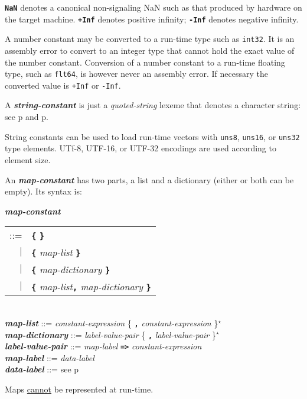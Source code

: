 \documentclass[12pt]{article}
\newcommand{\TT}[1]{{\tt \bfseries #1}}
\newcommand{\STAR}{{\Large $^\star$}}
\newcommand{\emkey}[1]{{\em \bfseries #1}}
\newcommand{\pagref}[1]{p\pageref{#1}}
\newenvironment{indpar}[1][0.3in]%
	{\begin{list}{}%
		     {\setlength{\itemsep}{0in}%
		      \setlength{\topsep}{0in}%
		      \setlength{\parsep}{1ex}%
		      \setlength{\labelwidth}{#1}%
		      \setlength{\leftmargin}{#1}%
		      \addtolength{\leftmargin}{\labelsep}}%
	 \item}%
	{\end{list}}
\begin{document}
\TT{NaN} denotes a canonical non-signaling NaN such
as that produced by hardware on the target machine.
\TT{+Inf} denotes positive infinity; \TT{-Inf} denotes negative infinity.

A number constant may be converted to a run-time type such as {\tt int32}.
It is an assembly error to convert to an integer type that cannot
hold the exact value of the number constant.
Conversion of a number constant
to a run-time floating type, such as {\tt flt64}, is however
never an assembly error.  If necessary the converted value is
{\tt +Inf} or {\tt -Inf}.

A \emkey{string-constant} is just a {\em quoted-string} lexeme
that denotes a character string: see
\pagref{QUOTED-STRING} and \pagref{QUOTED-STRING-CONCATENATION}.

String constants can be used to load run-time vectors
with {\tt uns8}, {\tt uns16}, or {\tt uns32} type elements.
UTf-8, UTF-16, or UTF-32 encodings are used according to element
size.

An \emkey{map-constant} has two parts, a list and a dictionary
(either or both can be empty).  Its syntax is:

\begin{indpar}
\emkey{map-constant}
    \begin{tabular}[t]{rl}
    ::= & \TT{\{} \TT{\}} \\
    $|$ & \TT{\{} {\em map-list} \TT{\}} \\
    $|$ & \TT{\{} {\em map-dictionary} \TT{\}} \\
    $|$ & \TT{\{} {\em map-list}\TT{,} {\em map-dictionary} \TT{\}} \\
    \end{tabular}
\\[0.5ex]
\emkey{map-list} ::= {\em constant-expression}
                     \{ \TT{,} {\em constant-expression} \}\STAR{}
\\[0.5ex]
\emkey{map-dictionary} ::= {\em label-value-pair}
                              \{ \TT{,} {\em label-value-pair} \}\STAR{}
\\[0.5ex]
\emkey{label-value-pair} ::=
    {\em map-label} \TT{=>} {\em constant-expression}
\\[0.5ex]
\emkey{map-label}\label{MAP-LABEL} ::= {\em data-label}
\\[0.5ex]
\emkey{data-label} ::= see \pagref{DATA-LABEL}
\end{indpar}

Maps \underline{cannot} be represented at run-time.
\end{document}

